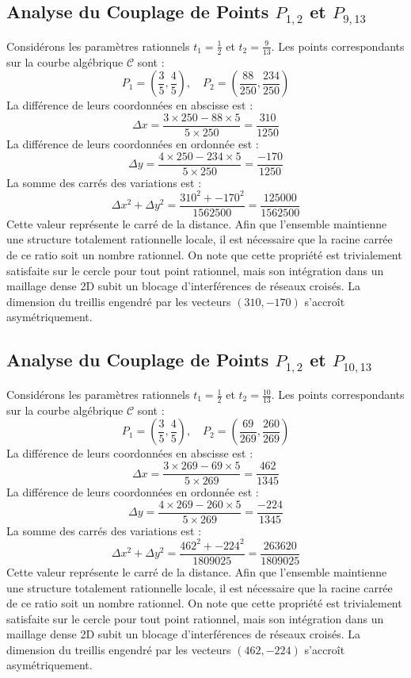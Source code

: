 \documentclass[12pt, a4paper]{article}
\begin{document}
\subsection{Analyse du Couplage de Points $P_{1,2}$ et $P_{9,13}$}
Considérons les paramètres rationnels $t_1 = \frac{1}{2}$ et $t_2 = \frac{9}{13}$.
Les points correspondants sur la courbe algébrique $\mathcal{C}$ sont :
$$ P_1 = \left( \frac{3}{5}, \frac{4}{5} \right), \quad P_2 = \left( \frac{88}{250}, \frac{234}{250} \right) $$
La différence de leurs coordonnées en abscisse est :
$$ \Delta x = \frac{3 \times 250 - 88 \times 5}{5 \times 250} = \frac{310}{1250} $$
La différence de leurs coordonnées en ordonnée est :
$$ \Delta y = \frac{4 \times 250 - 234 \times 5}{5 \times 250} = \frac{-170}{1250} $$
La somme des carrés des variations est :
$$ \Delta x^2 + \Delta y^2 = \frac{ 310^2 + -170^2 }{ 1562500 } = \frac{ 125000 }{ 1562500 } $$
Cette valeur représente le carré de la distance. Afin que l'ensemble maintienne une structure totalement rationnelle locale, il est nécessaire que la racine carrée de ce ratio soit un nombre rationnel. On note que cette propriété est trivialement satisfaite sur le cercle pour tout point rationnel, mais son intégration dans un maillage dense 2D subit un blocage d'interférences de réseaux croisés. La dimension du treillis engendré par les vecteurs $( 310, -170 )$ s'accroît asymétriquement.


\subsection{Analyse du Couplage de Points $P_{1,2}$ et $P_{10,13}$}
Considérons les paramètres rationnels $t_1 = \frac{1}{2}$ et $t_2 = \frac{10}{13}$.
Les points correspondants sur la courbe algébrique $\mathcal{C}$ sont :
$$ P_1 = \left( \frac{3}{5}, \frac{4}{5} \right), \quad P_2 = \left( \frac{69}{269}, \frac{260}{269} \right) $$
La différence de leurs coordonnées en abscisse est :
$$ \Delta x = \frac{3 \times 269 - 69 \times 5}{5 \times 269} = \frac{462}{1345} $$
La différence de leurs coordonnées en ordonnée est :
$$ \Delta y = \frac{4 \times 269 - 260 \times 5}{5 \times 269} = \frac{-224}{1345} $$
La somme des carrés des variations est :
$$ \Delta x^2 + \Delta y^2 = \frac{ 462^2 + -224^2 }{ 1809025 } = \frac{ 263620 }{ 1809025 } $$
Cette valeur représente le carré de la distance. Afin que l'ensemble maintienne une structure totalement rationnelle locale, il est nécessaire que la racine carrée de ce ratio soit un nombre rationnel. On note que cette propriété est trivialement satisfaite sur le cercle pour tout point rationnel, mais son intégration dans un maillage dense 2D subit un blocage d'interférences de réseaux croisés. La dimension du treillis engendré par les vecteurs $( 462, -224 )$ s'accroît asymétriquement.
\end{document}
